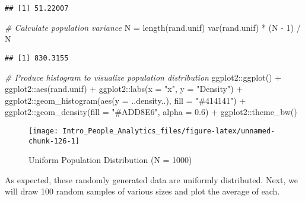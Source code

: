 \documentclass[
]{book}
\newenvironment{Shaded}{\begin{snugshade}}{\end{snugshade}}
\newcommand{\AttributeTok}[1]{\textcolor[rgb]{0.77,0.63,0.00}{#1}}
\newcommand{\CommentTok}[1]{\textcolor[rgb]{0.56,0.35,0.01}{\textit{#1}}}
\newcommand{\DecValTok}[1]{\textcolor[rgb]{0.00,0.00,0.81}{#1}}
\newcommand{\FloatTok}[1]{\textcolor[rgb]{0.00,0.00,0.81}{#1}}
\newcommand{\FunctionTok}[1]{\textcolor[rgb]{0.00,0.00,0.00}{#1}}
\newcommand{\NormalTok}[1]{#1}
\newcommand{\OtherTok}[1]{\textcolor[rgb]{0.56,0.35,0.01}{#1}}
\newcommand{\SpecialCharTok}[1]{\textcolor[rgb]{0.00,0.00,0.00}{#1}}
\newcommand{\StringTok}[1]{\textcolor[rgb]{0.31,0.60,0.02}{#1}}
\begin{document}
\begin{verbatim}
## [1] 51.22007
\end{verbatim}

\begin{Shaded}
\begin{Highlighting}[]
\CommentTok{\# Calculate population variance}
\NormalTok{N }\OtherTok{=} \FunctionTok{length}\NormalTok{(rand.unif)}
\FunctionTok{var}\NormalTok{(rand.unif) }\SpecialCharTok{*}\NormalTok{ (N }\SpecialCharTok{{-}} \DecValTok{1}\NormalTok{) }\SpecialCharTok{/}\NormalTok{ N}
\end{Highlighting}
\end{Shaded}

\begin{verbatim}
## [1] 830.3155
\end{verbatim}

\begin{Shaded}
\begin{Highlighting}[]
\CommentTok{\# Produce histogram to visualize population distribution}
\NormalTok{ggplot2}\SpecialCharTok{::}\FunctionTok{ggplot}\NormalTok{() }\SpecialCharTok{+} 
\NormalTok{ggplot2}\SpecialCharTok{::}\FunctionTok{aes}\NormalTok{(rand.unif) }\SpecialCharTok{+} 
\NormalTok{ggplot2}\SpecialCharTok{::}\FunctionTok{labs}\NormalTok{(}\AttributeTok{x =} \StringTok{"x"}\NormalTok{, }\AttributeTok{y =} \StringTok{"Density"}\NormalTok{) }\SpecialCharTok{+} 
\NormalTok{ggplot2}\SpecialCharTok{::}\FunctionTok{geom\_histogram}\NormalTok{(}\FunctionTok{aes}\NormalTok{(}\AttributeTok{y =}\NormalTok{ ..density..), }\AttributeTok{fill =} \StringTok{"\#414141"}\NormalTok{) }\SpecialCharTok{+}
\NormalTok{ggplot2}\SpecialCharTok{::}\FunctionTok{geom\_density}\NormalTok{(}\AttributeTok{fill =} \StringTok{"\#ADD8E6"}\NormalTok{, }\AttributeTok{alpha =} \FloatTok{0.6}\NormalTok{) }\SpecialCharTok{+}
\NormalTok{ggplot2}\SpecialCharTok{::}\FunctionTok{theme\_bw}\NormalTok{()}
\end{Highlighting}
\end{Shaded}

\begin{figure}

{\centering \texttt{[image: Intro\_People\_Analytics\_files/figure-latex/unnamed-chunk-126-1]} 

}

\caption{Uniform Population Distribution (N = 1000)}\label{fig:unnamed-chunk-126}
\end{figure}

As expected, these randomly generated data are uniformly distributed. Next, we will draw 100 random samples of various sizes and plot the average of each.
\end{document}
